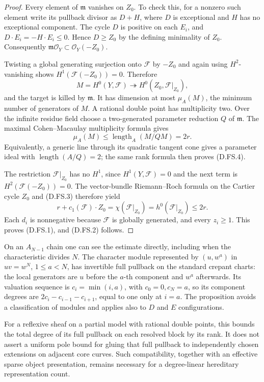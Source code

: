 \begin{proof}
Every element of $\mathfrak m$ vanishes on $Z_0$. To check this, for a
nonzero such element write its pullback divisor as $D+H$, where $D$ is
exceptional and $H$ has no exceptional component. The cycle $D$ is
positive on each $E_i$, and
$D\cdot E_i=-H\cdot E_i\le0$. Hence $D\ge Z_0$ by the defining
minimality of $Z_0$. Consequently
$\mathfrak m\mathcal O_Y\subset\mathcal O_Y(-Z_0)$.

Twisting a global generating surjection onto $\mathcal F$ by $-Z_0$
and again using $H^2$-vanishing shows
$H^1(\mathcal F(-Z_0))=0$. Therefore
\[
 M=H^0(Y,\mathcal F)\twoheadrightarrow
 H^0(Z_0,\mathcal F|_{Z_0}),
\]
and the target is killed by $\mathfrak m$. It has dimension at most
$\mu_A(M)$, the minimum number of generators of $M$.
A rational double point has multiplicity two. Over the infinite
residue field choose a two-generated parameter reduction $Q$ of
$\mathfrak m$. The maximal Cohen--Macaulay multiplicity formula gives
\[
 \mu_A(M)\le\operatorname{length}_A(M/QM)=2r.            \tag{D.FS.4}
\]
Equivalently, a generic line through its quadratic tangent cone gives
a parameter ideal with $\operatorname{length}(A/Q)=2$; the same rank
formula then proves (D.FS.4).

The restriction $\mathcal F|_{Z_0}$ has no $H^1$, since
$H^1(Y,\mathcal F)=0$ and the next term is $H^2(\mathcal F(-Z_0))=0$.
The vector-bundle Riemann--Roch formula on the Cartier cycle $Z_0$ and
(D.FS.3) therefore yield
\[
 r+c_1(\mathcal F)\cdot Z_0
 =\chi(\mathcal F|_{Z_0})
 =h^0(\mathcal F|_{Z_0})\le2r.
\]
Each $d_i$ is nonnegative because $\mathcal F$ is globally generated,
and every $z_i\ge1$. This proves (D.FS.1), and (D.FS.2) follows.
\end{proof}

\begin{remark}
On an $A_{N-1}$ chain one can see the estimate directly, including when
the characteristic divides $N$. The character module represented by
$(u,w^a)$ in $uv=w^N$, $1\le a<N$, has invertible full pullback on the
standard crepant charts: the local generators are $u$ before the $a$-th
component and $w^a$ afterwards. Its valuation sequence is
$c_i=\min(i,a)$, with $c_0=0,c_N=a$, so its component degrees are
$2c_i-c_{i-1}-c_{i+1}$, equal to one only at $i=a$.
The proposition avoids a classification of modules and applies also
to $D$ and $E$ configurations.

For a reflexive sheaf on a partial model with rational double points,
this bounds the total degree of its full pullback on each resolved
block by its rank. It does not assert a uniform pole bound for gluing
that full pullback to independently chosen extensions on adjacent
core curves. Such compatibility, together with an effective sparse
object presentation, remains necessary for a degree-linear hereditary
representation count.
\end{remark}
